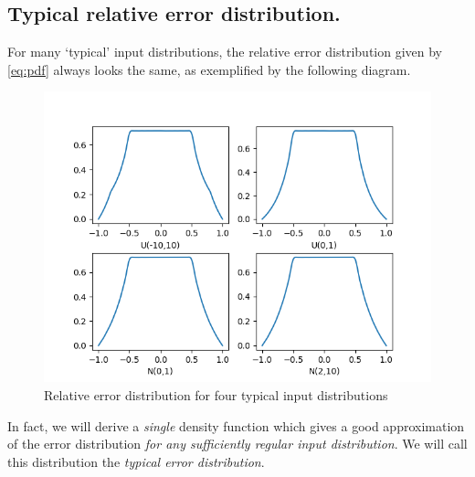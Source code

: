 \documentclass[10pt,a4paper]{article}
\theoremstyle{plain}
\theoremstyle{definition}
\begin{document}
\subsection{Typical relative error distribution.}

For many `typical' input distributions, the relative error distribution given by \eqref{eq:pdf}  always looks the same, as exemplified by the following diagram.

\begin{figure}[h!]
\begin{center}
\includegraphics[scale=0.75]{Code/pics/several_examples}
\end{center}
\caption{Relative error distribution for four typical input distributions}
\label{fig:errdist}
\end{figure}

In fact, we will derive a \emph{single} density function which gives a good approximation of the error distribution \emph{for any sufficiently regular input distribution}. We will call this distribution the \emph{typical error distribution}.
\end{document}
